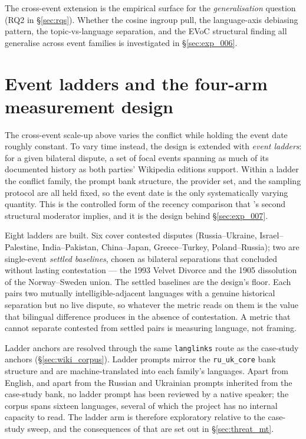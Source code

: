 The cross-event extension is the empirical surface for the
\emph{generalisation} question (RQ2 in \S\ref{sec:rqs}). Whether
the cosine ingroup pull, the language-axis debiasing pattern, the
topic-vs-language separation, and the EVoC structural finding all
generalise across event families is investigated in
\S\ref{sec:exp_006}.

\section{Event ladders and the four-arm measurement
  design}\label{sec:event_ladders}

The cross-event scale-up above varies the conflict while holding the
event date roughly constant. To vary time instead, the design is
extended with \emph{event ladders}: for a given bilateral dispute, a
set of focal events spanning as much of its documented history as
both parties' Wikipedia editions support. Within a ladder the
conflict family, the prompt bank structure, the provider set, and
the sampling protocol are all held fixed, so the event date is the
only systematically varying quantity. This is the controlled form of
the recency comparison that \citet{oeberst2020wikipedia}'s second
structural moderator implies, and it is the design behind
\S\ref{sec:exp_007}.

Eight ladders are built. Six cover contested disputes
(Russia--Ukraine, Israel--Palestine, India--Pakistan, China--Japan,
Greece--Turkey, Poland--Russia); two are single-event
\emph{settled baselines}, chosen as bilateral separations that
concluded without lasting contestation --- the 1993 Velvet Divorce
and the 1905 dissolution of the Norway--Sweden union. The settled
baselines are the design's floor. Each pairs two mutually
intelligible-adjacent languages with a genuine historical separation
but no live dispute, so whatever the metric reads on them is the
value that bilingual difference produces in the absence of
contestation. A metric that cannot separate contested from settled
pairs is measuring language, not framing.

Ladder anchors are resolved through the same \verb|langlinks| route
as the case-study anchors (\S\ref{sec:wiki_corpus}). Ladder prompts
mirror the \verb|ru_uk_core| bank structure and are
machine-translated into each family's languages. Apart from English,
and apart from the Russian and Ukrainian prompts inherited from the
case-study bank, no ladder prompt has been reviewed by a native
speaker; the corpus spans sixteen languages, several of which the
project has no internal capacity to read. The ladder arm is
therefore exploratory relative to the case-study sweep, and the
consequences of that are set out in \S\ref{sec:threat_mt}.

